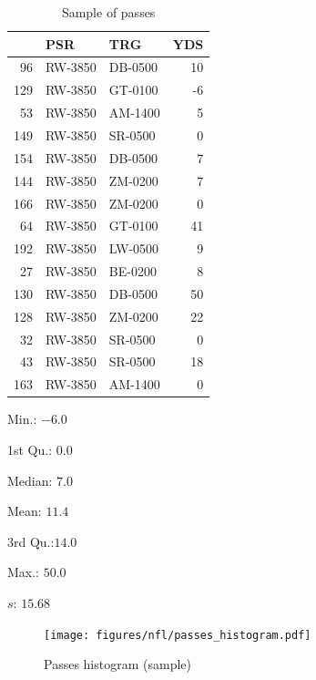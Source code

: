\documentclass{exam}
\begin{document}
  \begin{table}[H]
    \centering
    \begin{tabular}{rllr}
      \toprule
          & PSR     & TRG     & YDS \\
      \midrule
      96  & RW-3850 & DB-0500 & 10 \\
      129 & RW-3850 & GT-0100 & -6 \\
      53  & RW-3850 & AM-1400 & 5 \\
      149 & RW-3850 & SR-0500 & 0 \\
      154 & RW-3850 & DB-0500 & 7 \\
      144 & RW-3850 & ZM-0200 & 7 \\
      166 & RW-3850 & ZM-0200 & 0 \\
      64  & RW-3850 & GT-0100 & 41 \\
      192 & RW-3850 & LW-0500 & 9 \\
      27  & RW-3850 & BE-0200 & 8 \\
      130 & RW-3850 & DB-0500 & 50 \\
      128 & RW-3850 & ZM-0200 & 22 \\
      32  & RW-3850 & SR-0500 & 0 \\
      43  & RW-3850 & SR-0500 & 18 \\
      163 & RW-3850 & AM-1400 & 0 \\
      \bottomrule
    \end{tabular}
    \caption{Sample of passes}
  \end{table}

  \begin{itemize*}
    \item Min.: $-6.0$
    \item 1st Qu.: $0.0$
    \item Median: $7.0$ 
    \item Mean: $11.4$  
    \item 3rd Qu.:$14.0$
    \item Max.: $50.0$  
    \item $s$: $15.68$
  \end{itemize*}

  \begin{figure}[H]
    \centering
    \texttt{[image: figures/nfl/passes\_histogram.pdf]}
    \caption{Passes histogram (sample)}
  \end{figure}
\end{document}
